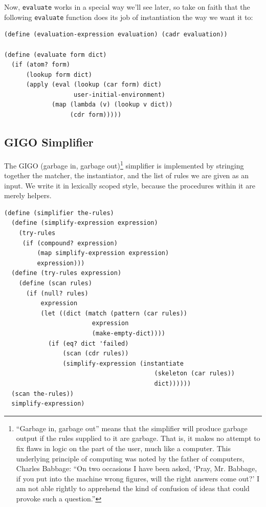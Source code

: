 \documentclass[9pt]{report}
\begin{document}
Now, \texttt{evaluate} works in a special way we'll see later, so take on
faith that the following \texttt{evaluate} function does its job of
instantiation the way we want it to:

\begin{verbatim}
(define (evaluation-expression evaluation) (cadr evaluation))

(define (evaluate form dict)
  (if (atom? form)
      (lookup form dict)
      (apply (eval (lookup (car form) dict)
                   user-initial-environment)
             (map (lambda (v) (lookup v dict))
                  (cdr form)))))
\end{verbatim}

\subsection{GIGO Simplifier}
\label{sec:org15151ec}

The GIGO (garbage in, garbage out)\footnote{``Garbage in, garbage out'' means that the simplifier will
produce garbage output if the rules supplied to it are garbage. That
is, it makes no attempt to fix flaws in logic on the part of the user,
much like a computer. This underlying principle of computing was noted
by the father of computers, Charles Babbage: ``On two occasions I have
been asked, `Pray, Mr. Babbage, if you put into the machine wrong
figures, will the right answers come out?' I am not able rightly
to apprehend the kind of confusion of ideas that could provoke such a
question.''} simplifier is implemented
by stringing together the matcher, the instantiator, and the list
of rules we are given as an input. We write it in lexically scoped
style, because the procedures within it are merely helpers.

\begin{verbatim}
(define (simplifier the-rules)
  (define (simplify-expression expression)
    (try-rules
     (if (compound? expression)
         (map simplify-expression expression)
         expression)))
  (define (try-rules expression)
    (define (scan rules)
      (if (null? rules)
          expression
          (let ((dict (match (pattern (car rules))
                        expression
                        (make-empty-dict))))
            (if (eq? dict 'failed)
                (scan (cdr rules))
                (simplify-expression (instantiate
                                         (skeleton (car rules))
                                         dict))))))
  (scan the-rules))
  simplify-expression)
\end{verbatim}
\end{document}
